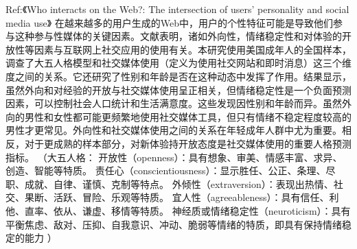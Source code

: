 Ref:《Who interacts on the Web?: The intersection of users’ personality and social media use》
在越来越多的用户生成的Web中，用户的个性特征可能是导致他们参与这种参与性媒体的关键因素。文献表明，诸如外向性，情绪稳定性和对体验的开放性等因素与互联网上社交应用的使用有关。本研究使用美国成年人的全国样本，调查了大五人格模型和社交媒体使用（定义为使用社交网站和即时消息）这三个维度之间的关系。它还研究了性别和年龄是否在这种动态中发挥了作用。结果显示，虽然外向和对经验的开放与社交媒体使用呈正相关，但情绪稳定性是一个负面预测因素，可以控制社会人口统计和生活满意度。这些发现因性别和年龄而异。虽然外向的男性和女性都可能更频繁地使用社交媒体工具，但只有情绪不稳定程度较高的男性才更常见。外向性和社交媒体使用之间的关系在年轻成年人群中尤为重要。相反，对于更成熟的样本部分，对新体验持开放态度是社交媒体使用的重要人格预测指标。
（大五人格：
开放性（openness）：具有想象、审美、情感丰富、求异、创造、智能等特质。
责任心（conscientiousness）：显示胜任、公正、条理、尽职、成就、自律、谨慎、克制等特点。
外倾性（extraversion）：表现出热情、社交、果断、活跃、冒险、乐观等特质。
宜人性（agreeableness）：具有信任、利他、直率、依从、谦虚、移情等特质。
神经质或情绪稳定性（neuroticism）：具有平衡焦虑、敌对、压抑、自我意识、冲动、脆弱等情绪的特质，即具有保持情绪稳定的能力
）



